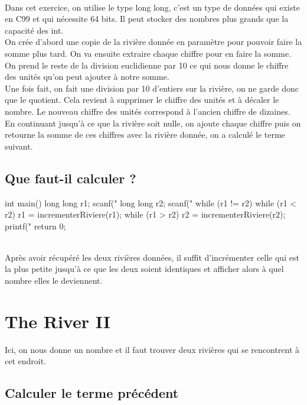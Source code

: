 \documentclass{article}
\begin{document}
\\ Dans cet exercice, on utilise le type \og long long\fg , c'est un type de données qui existe en C99 et qui nécessite 64 bits. Il peut stocker des nombres plus grands que la capacité des \og int\fg.
\\ On crée d'abord une copie de la rivière donnée en paramètre pour pouvoir faire la somme plus tard. On va ensuite extraire chaque chiffre pour en faire la somme. On prend le reste de la division euclidienne par 10 ce qui nous donne le chiffre des unités qu'on peut ajouter à notre somme.
\\ Une fois fait, on fait une division par 10 d'entiers sur la rivière, on ne garde donc que le quotient. Cela revient à supprimer le chiffre des unités et à décaler le nombre. Le nouveau chiffre des unités correspond à l'ancien chiffre de dizaines.
\\ En continuant jusqu'à ce que la rivière soit nulle, on ajoute chaque chiffre puis on retourne la somme de ces chiffres avec la rivière donnée, on a calculé le terme suivant.

\subsection{Que faut-il calculer ?}

\begin{boxedverbatim}
  int main()
{
    long long r1;
    scanf("%
    long long r2;
    scanf("%
    while (r1 != r2)
    {
        while (r1 < r2)
        {
            r1 = incrementerRiviere(r1);
        }
        while (r1 > r2)
        {
            r2 = incrementerRiviere(r2);
        }
    }
    printf("%
    return 0;
}
\end{boxedverbatim}

\\ Après avoir récupéré les deux rivières données, il suffit d'incrémenter celle qui est la plus petite jusqu'à ce que les deux soient identiques et afficher alors à quel nombre elles le deviennent.

\section{The River II}

Ici, on nous donne un nombre et il faut trouver deux rivières qui se rencontrent à cet endroit.

\subsection{Calculer le terme précédent}
\end{document}
